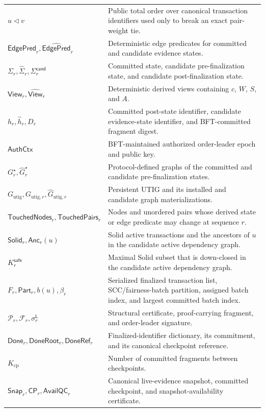 \begin{table}[t]
\begin{tabular}{p{}p{}}
$u\triangleleft v$ & Public total order over canonical transaction identifiers used only to break an exact pair-weight tie. \\
$\mathsf{EdgePred}_r,\widehat{\mathsf{EdgePred}}_r$ & Deterministic edge predicates for committed and candidate evidence states. \\
$\Sigma_r,\widehat\Sigma_r,\Sigma_r^{\mathsf{cand}}$ & Committed state, candidate pre-finalization state, and candidate post-finalization state. \\
$\mathsf{View}_r,\widehat{\mathsf{View}}_r$ & Deterministic derived views containing $c$, $W$, $S$, and $A$. \\
$h_r,\widehat h_r,D_r$ & Committed post-state identifier, candidate evidence-state identifier, and BFT-committed fragment digest. \\
$\mathsf{AuthCtx}$ & BFT-maintained authorized order-leader epoch and public key. \\
$G_r^\star,\widehat G_r^\star$ & Protocol-defined graphs of the committed and candidate pre-finalization states. \\
$G_{\mathrm{utig}},G_{\mathrm{utig},r},\widehat G_{\mathrm{utig},r}$ & Persistent UTIG and its installed and candidate graph materializations. \\
$\mathsf{TouchedNodes}_r,\mathsf{TouchedPairs}_r$ & Nodes and unordered pairs whose derived state or edge predicate may change at sequence $r$. \\
$\mathsf{Solid}_r,\mathsf{Anc}_r(u)$ & Solid active transactions and the ancestors of $u$ in the candidate active dependency graph. \\
$K_r^{\mathsf{safe}}$ & Maximal Solid subset that is down-closed in the candidate active dependency graph. \\
$F_r,\mathsf{Part}_r,b(u),\beta_r$ & Serialized finalized transaction list, SCC/fairness-batch partition, assigned batch index, and largest committed batch index. \\
$\mathcal P_r,\mathcal F_r,\sigma_r^{\mathsf L}$ & Structural certificate, proof-carrying fragment, and order-leader signature. \\
$\mathsf{Done}_r,\mathsf{DoneRoot}_r,\mathsf{DoneRef}_r$ & Finalized-identifier dictionary, its commitment, and its canonical checkpoint reference. \\
$K_{\mathrm{cp}}$ & Number of committed fragments between checkpoints. \\
$\mathsf{Snap}_r,\mathsf{CP}_r,\mathsf{AvailQC}_r$ & Canonical live-evidence snapshot, committed checkpoint, and snapshot-availability certificate. \\
\hline
\end{tabular}
\end{table}


